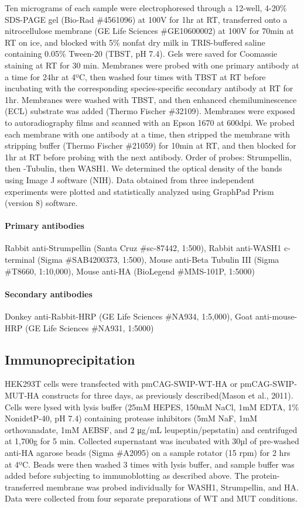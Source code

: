 Ten micrograms of each sample were electrophoresed through a 12-well, 4-20\%
SDS-PAGE gel (Bio-Rad \#4561096) at 100V for 1hr at RT, transferred onto a
nitrocellulose membrane (GE Life Sciences \#GE10600002) at 100V for 70min at RT
on ice, and blocked with 5\% nonfat dry milk in TRIS-buffered saline containing
0.05\% Tween-20 (TBST, pH 7.4). Gels were saved for Coomassie staining at RT for
30 min. Membranes were probed with one primary antibody at a time for 24hr at
4ºC, then washed four times with TBST at RT before incubating with the
corresponding species-specific secondary antibody at RT for 1hr. Membranes were
washed with TBST, and then enhanced chemiluminescence (ECL) substrate was added
(Thermo Fischer \#32109). Membranes were exposed to autoradiography films and
scanned with an Epson 1670 at 600dpi. We probed each membrane with one antibody
at a time, then stripped the membrane with stripping buffer (Thermo Fischer
\#21059) for 10min at RT, and then blocked for 1hr at RT before probing with the
next antibody. Order of probes: Strumpellin, then \textbeta-Tubulin, then WASH1.
We determined the optical density of the bands using Image J software (NIH).
Data obtained from three independent experiments were plotted and statistically
analyzed using GraphPad Prism (version 8) software.

\paragraph{Primary antibodies} Rabbit anti-Strumpellin
(Santa Cruz \#sc-87442, 1:500), Rabbit anti-WASH1 c-terminal (Sigma
\#SAB4200373, 1:500), Mouse anti-Beta Tubulin III (Sigma \#T8660, 1:10,000),
Mouse anti-HA (BioLegend \#MMS-101P, 1:5000)

\paragraph{Secondary antibodies} Donkey anti-Rabbit-HRP
(GE Life Sciences \#NA934, 1:5,000), Goat anti-mouse-HRP (GE Life Sciences
\#NA931, 1:5000)

\subsection{Immunoprecipitation}

HEK293T cells were transfected with pmCAG-SWIP-WT-HA or pmCAG-SWIP-MUT-HA
constructs for three days, as previously described(Mason et al., 2011). Cells
were lysed with lysis buffer (25mM HEPES, 150mM NaCl, 1mM EDTA, 1\% NonidetP-40,
pH 7.4) containing protease inhibitors (5mM NaF, 1mM orthovanadate, 1mM AEBSF,
and 2 μg/mL leupeptin/pepstatin) and centrifuged at 1,700g for 5 min. Collected
supernatant was incubated with 30µl of pre-washed anti-HA agarose beads (Sigma
\#A2095) on a sample rotator (15 rpm) for 2 hrs at 4ºC. Beads were then washed 3
times with lysis buffer, and sample buffer was added before subjecting to
immunoblotting as described above. The protein-transferred membrane was probed
individually for WASH1, Strumpellin, and HA. Data were collected from four
separate preparations of WT and MUT conditions. 

